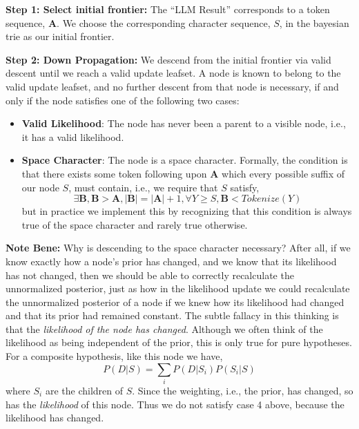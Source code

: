 \textbf{Step 1: Select initial frontier:}
The ``LLM Result'' corresponds to a token sequence, $\mathbf{A}$.
We choose the corresponding character sequence, $S$, in the bayesian trie as our initial frontier.

\textbf{Step 2: Down Propagation:}
We descend from the initial frontier via valid descent until we reach a valid update leafset.
A node is known to belong to the valid update leafset, and no further descent from that
node is necessary, if and only if the node satisfies one of the following two cases:
\begin{itemize}
    \item \textbf{Valid Likelihood}: The node has never been a parent to a visible node, i.e., it has a valid likelihood.
    \item \textbf{Space Character}: The node is a space character. Formally, the condition is that there exists
    some token following upon $\mathbf{A}$ which every possible suffix of our node $S$, must contain, i.e.,
    we require that $S$ satisfy,
    $$
    \exists \mathbf{B}, \mathbf{B}>\mathbf{A}, |\mathbf{B}|=|\mathbf{A}|+1, \forall Y \geq S, \mathbf{B} < Tokenize(Y)
    $$
    but in practice we implement this by recognizing that this condition is always true of the space
    character and rarely true otherwise.
\end{itemize}

\textbf{Note Bene:} Why is descending to the space character necessary? After all,
if we know exactly how a node's prior has changed, and we know that its likelihood has not changed,
then we should be able to correctly recalculate the unnormalized posterior, just as how 
in the likelihood update we could recalculate the unnormalized posterior of a node
if we knew how its likelihood had changed and that its prior had remained constant.
The subtle fallacy in this thinking is that the \textit{likelihood of the node has changed}.
Although we often think of the likelihood as being independent of the prior,
this is only true for pure hypotheses. For a composite hypothesis, like this node we have,
$$
P(D | S) = \sum_i P(D | S_i) P(S_i | S)
$$
where $S_i$ are the children of $S$.
Since the weighting, i.e., the prior, has changed, so has the \textit{likelihood}
of this node.
Thus we do not satisfy case 4 above, because the likelihood has changed.


